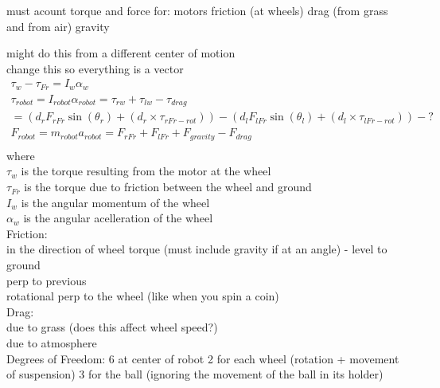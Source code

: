 \documentclass{report}
\begin{document}
must acount torque and force for:
motors
friction (at wheels)
drag (from grass and from air)
gravity

might do this from a different center of motion \\
change this so everything is a vector \\
\begin{gather*}
\tau _{w} - \tau _{Fr} = I_{w} \alpha _{w} \\
\tau _{robot} = I_{robot} \alpha _{robot} = \tau _{rw} + \tau _{lw} - \tau _{drag} \\
= (d_{r} F_{rFr} \sin (\theta _{r}) + (d_{r} \times \tau _{rFr-rot})) - (d_{l} F_{lFr} \sin (\theta _{l}) + (d_{l} \times \tau _{lFr-rot})) - ? \\
F_{robot} = m_{robot} a_{robot} = F_{rFr} + F_{lFr} + F_{gravity} - F_{drag} \\
\end{gather*}
where \\
$\tau _{w}$ is the torque resulting from the motor at the wheel \\
$\tau _{Fr}$ is the torque due to friction between the wheel and ground \\
$I_{w}$ is the angular momentum of the wheel \\
$\alpha _{w}$ is the angular acelleration of the wheel \\

Friction: \\
in the direction of wheel torque (must include gravity if at an angle) - level to ground \\
perp to previous \\
rotational perp to the wheel (like when you spin a coin) \\

Drag: \\
due to grass (does this affect wheel speed?) \\
due to atmosphere \\

Degrees of Freedom:
6 at center of robot
2 for each wheel (rotation + movement of suspension)
3 for the ball (ignoring the movement of the ball in its holder)
\end{document}
